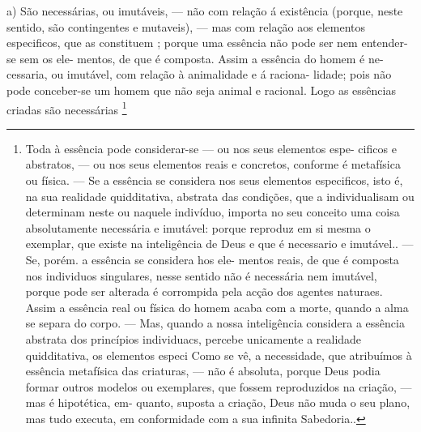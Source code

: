 \documentclass[12pt,a4paper]{article}
\newcommand{\pagmark}[1]{\quad[\textit{p.\,#1}]\quad}
\begin{document}
{{{{{{{     \medskip\noindent a) São necessárias, ou imutáveis, — não com relação á
 existência (porque, neste sentido, são contingentes e mutaveis), —
 mas com relação aos elementos especificos, que as constituem
 ;
 porque uma essência não pode ser nem entender-se sem os ele-
 mentos, de que é composta. Assim a essência do homem é ne-
 cessaria, ou imutável, com relação à animalidade e á raciona-
 lidade; pois não pode conceber-se um homem que não seja
 animal e racional. Logo as essências criadas são necessárias \footnote{Toda à essência pode considerar-se — ou nos seus elementos espe-
 cificos e abstratos,
 — ou nos seus elementos reais e concretos, conforme é
 metafísica ou física. — Se a essência se considera nos seus elementos
 especificos, isto é, na sua realidade quidditativa, abstrata das condições,
 que a individualisam ou determinam neste ou naquele indivíduo, importa
 no seu conceito uma coisa absolutamente necessária e imutável: porque
 reproduz em si mesma o exemplar, que existe na inteligência de Deus e que
 é necessario e imutável..  — Se, porém. a essência se considera hos ele-
 mentos reais, de que é composta nos individuos singulares, nesse sentido
 não é necessária nem imutável, porque pode ser alterada é corrompida pela
 acção dos agentes naturaes. Assim a essência real ou física do homem
 acaba com a morte, quando a alma se separa do corpo. — Mas, quando a
 nossa inteligência considera a essência abstrata dos princípios individuacs,
 percebe unicamente a realidade quidditativa, os elementos especi
 Como se vê, a necessidade, que atribuímos à essência metafísica das
 criaturas, — não é absoluta, porque Deus podia formar outros modelos ou
\pagmark{309}
exemplares, que fossem reproduzidos na criação, — mas é hipotética, em-
 quanto, suposta a criação, Deus não muda o seu plano, mas tudo executa,
 em conformidade com a sua infinita Sabedoria.. 
\pagmark{309}

}}}}}}}}
\end{document}
